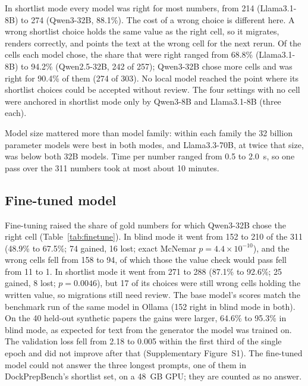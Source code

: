 In shortlist mode every model was right for most numbers, from 214 (Llama3.1-8B) to 274
(Qwen3-32B, 88.1\%). The cost of a wrong choice is different here. A wrong shortlist choice
holds the same value as the right cell, so it migrates, renders correctly, and points the text at
the wrong cell for the next rerun. Of the cells each model chose, the share that were right
ranged from 68.8\% (Llama3.1-8B) to 94.2\% (Qwen2.5-32B, 242 of 257); Qwen3-32B chose more cells
and was right for 90.4\% of them (274 of 303). No local model reached the point where its
shortlist choices could be accepted without review. The four settings with no cell were
anchored in shortlist mode only by Qwen3-8B and Llama3.1-8B (three each).

Model size mattered more than model family: within each family the 32 billion parameter models
were best in both modes, and Llama3.3-70B, at twice that size, was below both 32B models. Time per
number ranged from 0.5 to 2.0~s, so one pass over the 311 numbers took at most about 10 minutes.

\subsection{Fine-tuned model}
\label{sec:res-finetune}

Fine-tuning raised the share of gold numbers for which Qwen3-32B chose the right cell
(Table~\ref{tab:finetune}). In blind mode it went from 152 to 210 of the 311 (48.9\% to 67.5\%;
74 gained, 16 lost; exact McNemar $p = 4.4 \times 10^{-10}$), and the wrong cells fell from 158 to
94, of which those the value check would pass fell from 11 to 1. In shortlist mode it went from
271 to 288 (87.1\% to 92.6\%; 25 gained, 8 lost; $p = 0.0046$), but 17 of its choices were still
wrong cells holding the written value, so migrations still need review. The base model's scores
match the benchmark run of the same model in Ollama (152 right in blind mode in both). On the 40
held-out synthetic papers the gains were larger, 64.6\% to 95.3\% in blind mode, as expected for
text from the generator the model was trained on. The validation loss fell from 2.18 to 0.005
within the first third of the single epoch and did not improve after that (Supplementary
Figure~S1). The fine-tuned model could not answer the three longest prompts, one of them in
DockPrepBench's shortlist set, on a 48~GB GPU; they are counted as no answer.

